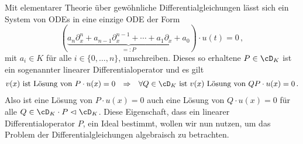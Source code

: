 Mit elementarer Theorie über gewöhnliche Differentialgleichungen lässt sich
ein System von ODEs in eine einzige ODE der Form
\begin{equation} \label{eq:UmgeformteODE}
(\underset{=:P}{\underbrace{ a_n\partial_x^n + a_{n-1}\partial_x^{n-1} +
  \cdots + a_1\partial_x + a_0}})\cdot u(t)=0 \,,
\end{equation}
mit $a_i\in K$ für alle $i\in\{0,\dots,n\}$, umschreiben. Dieses so erhaltene
$P\in\cD_K$ ist ein sogenannter linearer Differentialoperator und es gilt
\begin{align*}
v(x) \text{ ist Lösung von } P\cdot u(x)=0
&&\Rightarrow && \forall Q\in \cD_K \text{ ist } v(x) \text{ Lösung von }
QP\cdot u(x)=0 \,.
\end{align*}
Also ist eine Lösung von $P\cdot u(x)=0$ auch eine Lösung von $Q\cdot u(x)=0$
für alle $Q\in\cD_K\cdot P\vartriangleleft \cD_K$.
Diese Eigenschaft, dass ein linearer Differentialoperator $P$, ein Ideal
bestimmt, wollen wir nun nutzen, um das Problem der Differentialgleichungen
algebraisch zu betrachten.

\begin{comment}
Sei $P$ ein linearer Differentialoperator mit Koeffizienten in $a_i(x)\in\Ckx$
geschrieben als $P=\sum^{d}_{i=0}{a_{i}(x)\partial_x^i}$.
Man sagt eine Funktion $u\in\cF$ ist Lösung von $P$, falls $u$ die Gleichung
$Pu=0$ erfüllt.
Man sagt $0$ ist ein singulärer Punkt falls $a_d(0)=0$.
Falls $0$ kein singulärer Punkt ist, hat $P$ genau $d$ über $\C$ Unabhängige
Lösungen in $\Ckx$. %
\end{comment}

